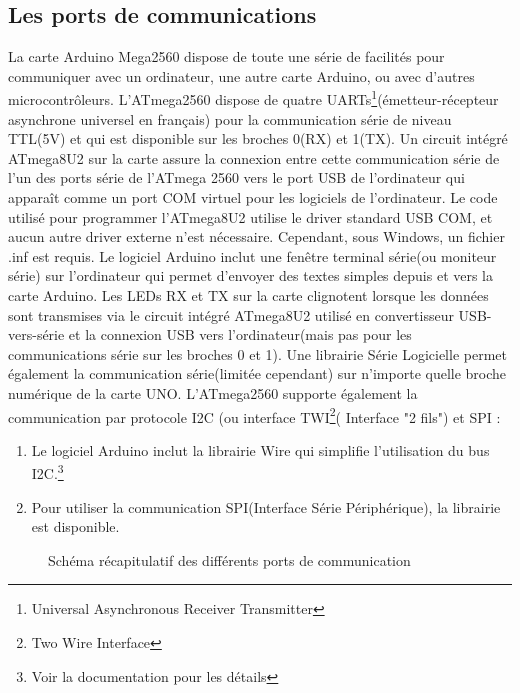 \documentclass[12pt, openany]{report}
\begin{document}
         		 \subsection{Les ports de communications}
         		 La carte Arduino Mega2560 dispose de toute une série de facilités pour communiquer avec un ordinateur, une autre carte Arduino, ou avec d'autres microcontrôleurs. L'ATmega2560 dispose de quatre UARTs\footnote{Universal Asynchronous Receiver Transmitter}(émetteur-récepteur asynchrone universel en français) pour la communication série de niveau TTL(5V) et qui est disponible sur les broches 0(RX) et 1(TX). Un circuit intégré ATmega8U2 sur la carte assure la connexion entre cette communication série de l'un des ports série de l'ATmega 2560 vers le port USB de l'ordinateur qui apparaît comme un port COM virtuel pour les logiciels de l'ordinateur. Le code utilisé pour programmer l'ATmega8U2 utilise le driver standard USB COM, et aucun autre driver externe n'est nécessaire. Cependant, sous Windows, un fichier .inf est requis.
         		 Le logiciel Arduino inclut une fenêtre terminal série(ou moniteur série) sur l'ordinateur qui permet d'envoyer des textes simples depuis et vers la carte Arduino. Les LEDs RX et TX sur la carte clignotent lorsque les données sont transmises via le circuit intégré ATmega8U2 utilisé en convertisseur USB-vers-série et la connexion USB vers l'ordinateur(mais pas pour les communications série sur les broches 0 et 1).
         		 Une librairie Série Logicielle permet également la communication série(limitée cependant) sur n'importe quelle broche numérique de la carte UNO.
         		 L'ATmega2560 supporte également la communication par protocole I2C (ou interface TWI\footnote{Two Wire Interface}( Interface "2 fils") et SPI :
         		 \begin{enumerate}
         		 \item Le logiciel Arduino inclut la librairie Wire qui simplifie l'utilisation du bus I2C.\footnote{Voir la documentation pour les détails}
         		 \item Pour utiliser la communication SPI(Interface Série Périphérique), la librairie est disponible.
         		
         		 \end{enumerate}
         \begin{figure}[!h  ]
          \centering

  \caption{Schéma récapitulatif des différents ports de communication}
         		          		
 \end{figure}
 \newpage
         		
\end{document}
